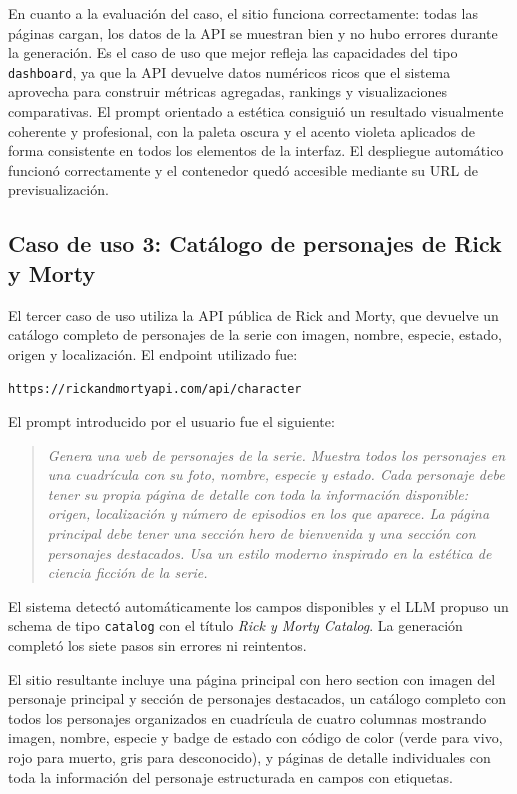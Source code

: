 En cuanto a la evaluación del caso, el sitio funciona correctamente: todas las páginas cargan, los datos de la API se muestran bien y no hubo errores durante la generación. Es el caso de uso que mejor refleja las capacidades del tipo \texttt{dashboard}, ya que la API devuelve datos numéricos ricos que el sistema aprovecha para construir métricas agregadas, rankings y visualizaciones comparativas. El prompt orientado a estética consiguió un resultado visualmente coherente y profesional, con la paleta oscura y el acento violeta aplicados de forma consistente en todos los elementos de la interfaz. El despliegue automático funcionó correctamente y el contenedor quedó accesible mediante su URL de previsualización.


\subsection{Caso de uso 3: Catálogo de personajes de Rick y Morty}
\label{subsec:caso-rickmorty}

El tercer caso de uso utiliza la API pública de Rick and Morty, que devuelve un catálogo completo de personajes de la serie con imagen, nombre, especie, estado, origen y localización. El endpoint utilizado fue:

\begin{center}
\texttt{https://rickandmortyapi.com/api/character}
\end{center}

El prompt introducido por el usuario fue el siguiente:

\begin{quote}
\textit{Genera una web de personajes de la serie. Muestra todos los personajes en una cuadrícula con su foto, nombre, especie y estado. Cada personaje debe tener su propia página de detalle con toda la información disponible: origen, localización y número de episodios en los que aparece. La página principal debe tener una sección hero de bienvenida y una sección con personajes destacados. Usa un estilo moderno inspirado en la estética de ciencia ficción de la serie.}
\end{quote}

El sistema detectó automáticamente los campos disponibles y el LLM propuso un schema de tipo \texttt{catalog} con el título \textit{Rick y Morty Catalog}. La generación completó los siete pasos sin errores ni reintentos.

El sitio resultante incluye una página principal con hero section con imagen del personaje principal y sección de personajes destacados, un catálogo completo con todos los personajes organizados en cuadrícula de cuatro columnas mostrando imagen, nombre, especie y badge de estado con código de color (verde para vivo, rojo para muerto, gris para desconocido), y páginas de detalle individuales con toda la información del personaje estructurada en campos con etiquetas.


